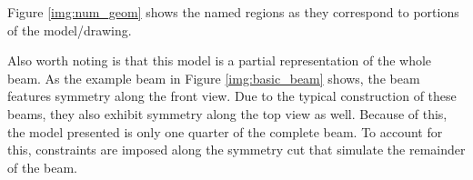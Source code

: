 Figure \ref{img:num_geom} shows the named regions as they correspond to portions of the model/drawing. 

Also worth noting is that this model is a partial representation of the whole beam. As the example beam in Figure \ref{img:basic_beam} shows, the beam features symmetry along the front view. Due to the typical construction of these beams, they also exhibit symmetry along the top view as well. Because of this, the model presented is only one quarter of the complete beam. To account for this, constraints are imposed along the symmetry cut that simulate the remainder of the beam. 

